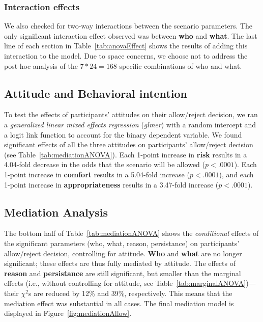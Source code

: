 \subsubsection{Interaction effects}
We also checked for two-way interactions between the scenario parameters. The only significant interaction effect observed was between \textbf{who} and \textbf{what}. The last line of each section in Table~\ref{tab:anovaEffect} shows the results of adding this interaction to the model. Due to space concerns, we choose not to address the post-hoc analysis of the $7 * 24 = 168$ specific combinations of who and what.

\subsection{Attitude and Behavioral intention}
To test the effects of participants' attitudes on their allow/reject decision, we ran a \emph{generalized linear mixed effects regression} (\emph{glmer}) with a random intercept and a logit link function to account for the binary dependent variable.
We found significant effects of all the three attitudes on participants' allow/reject decision (see Table~\ref{tab:mediationANOVA}). Each 1-point increase in \textbf{risk} results in a 4.04-fold decrease in the odds that the scenario will be allowed ($p < .0001$). Each 1-point increase in \textbf{comfort} results in a 5.04-fold increase ($p < .0001$), and each 1-point increase in \textbf{appropriateness} results in a 3.47-fold increase ($p < .0001$).

\subsection{Mediation Analysis}
The bottom half of Table~\ref{tab:mediationANOVA} shows the \emph{conditional} effects of the significant parameters (who, what, reason, persistance) on participants' allow/reject decision, controlling for attitude. \textbf{Who} and \textbf{what} are no longer significant; these effects are thus fully mediated by attitude. The effects of \textbf{reason} and \textbf{persistance} are still significant, but smaller than the marginal effects (i.e., without controlling for attitude, see Table~\ref{tab:marginalANOVA})---their $\chi^2$s are reduced by 12\% and 39\%, respectively. This means that the mediation effect was substantial in all cases. The final mediation model is displayed in Figure~\ref{fig:mediationAllow}.


